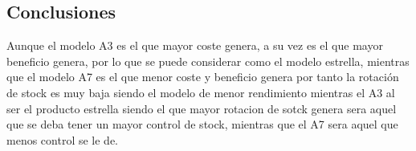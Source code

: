 \documentclass{report}
\begin{document}
\begin{raggedright}
\section{Conclusiones}
Aunque el modelo A3 es el que mayor coste genera, a su vez es el que mayor beneficio genera, por lo que se puede considerar como el modelo estrella, mientras que el modelo A7 es el que menor coste y beneficio genera por tanto la rotación de stock es muy baja siendo el modelo de menor rendimiento mientras el A3 al ser el producto estrella siendo el que mayor rotacion de sotck genera
sera aquel que se deba tener un mayor control de stock, mientras que el A7 sera aquel que menos control se le de.\\
\end{raggedright}
\end{document}
